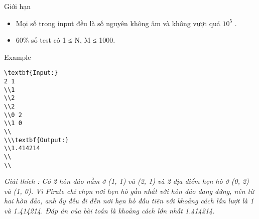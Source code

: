 Giới hạn  
\begin{itemize}
	\item     Mọi số trong input đều là số nguyên không âm và không vượt quá $10^{5}$    .   
	\item     60\% số test có 1 ≤ N, M ≤ 1000.   
\end{itemize}
   Example  
\begin{verbatim}
\textbf{Input:}
2 1 
\\1 
\\2
\\2
\\0 2
\\1 0
\\
\\\textbf{Output:}
\\1.414214
\\
\\\end{verbatim}



\emph{     Giải thích        : Có 2 hòn đảo nằm ở (1, 1) và (2, 1) và 2 địa điểm hẹn hò ở (0, 2) và (1, 0). Vì Pirate chỉ chọn nơi hẹn hò gần nhất với hòn đảo đang đứng, nên từ hai hòn đảo, anh ấy đều đi đến nơi hẹn hò đầu tiên với khoảng cách lần lượt là 1 và 1.414214. Đáp án của bài toán là khoảng cách lớn nhất 1.414214.    
\\}